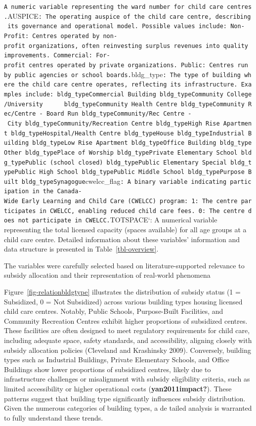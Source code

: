 \documentclass[
  letterpaper,
  DIV=11,
  numbers=noendperiod]{scrartcl}
\begin{document}
\texttt{A\ numeric\ variable\ representing\ the\ ward\ number\ for\ child\ care\ centres.}AUSPICE\texttt{:\ The\ operating\ auspice\ of\ the\ child\ care\ centre,\ describing\ its\ governance\ and\ operational\ model.\ Possible\ values\ include:\ Non-Profit:\ Centres\ operated\ by\ non-profit\ organizations,\ often\ reinvesting\ surplus\ revenues\ into\ quality\ improvements.\ Commercial:\ For-profit\ centres\ operated\ by\ private\ organizations.\ Public:\ Centres\ run\ by\ public\ agencies\ or\ school\ boards.}bldg\_type\texttt{:\ The\ type\ of\ building\ where\ the\ child\ care\ centre\ operates,\ reflecting\ its\ infrastructure.\ Examples\ include:\ bldg\_typeCommercial\ Building\ bldg\_typeCommunity\ College/University\ \ \ \ \ \ bldg\_typeCommunity\ Health\ Centre\ bldg\_typeCommunity\ Rec/Centre\ -\ Board\ Run\ bldg\_typeCommunity/Rec\ Centre\ -\ City\ bldg\_typeCommunity/Recreation\ Centre\ bldg\_typeHigh\ Rise\ Apartment\ bldg\_typeHospital/Health\ Centre\ bldg\_typeHouse\ bldg\_typeIndustrial\ Building\ bldg\_typeLow\ Rise\ Apartment\ bldg\_typeOffice\ Building\ bldg\_typeOther\ bldg\_typePlace\ of\ Worship\ bldg\_typePrivate\ Elementary\ School\ bldg\_typePublic\ (school\ closed)\ bldg\_typePublic\ Elementary\ Special\ bldg\_typePublic\ High\ School\ bldg\_typePublic\ Middle\ School\ bldg\_typePurpose\ Built\ bldg\_typeSynagogue}cwelcc\_flag\texttt{:\ A\ binary\ variable\ indicating\ participation\ in\ the\ Canada-Wide\ Early\ Learning\ and\ Child\ Care\ (CWELCC)\ program:\ 1:\ The\ centre\ participates\ in\ CWELCC,\ enabling\ reduced\ child\ care\ fees.\ 0:\ The\ centre\ does\ not\ participate\ in\ CWELCC.}TOTSPACE`:
A numerical variable representing the total licensed capacity (spaces
available) for all age groups at a child care centre. Detailed
information about these variables' information and data structure is
presented in Table~\ref{tbl-overview}.

The variables were carefully selected based on literature-supported
relevance to subsidy allocation and their representation of real-world
phenomena

Figure~\ref{fig-relationbldgtype} illustrates the distribution of
subsidy status (1 = Subsidized, 0 = Not Subsidized) across various
building types housing licensed child care centres. Notably, Public
Schools, Purpose-Built Facilities, and Community Recreation Centres
exhibit higher proportions of subsidized centres. These facilities are
often designed to meet regulatory requirements for child care, including
adequate space, safety standards, and accessibility, aligning closely
with subsidy allocation policies (Cleveland and Krashinsky 2009).
Conversely, building types such as Industrial Buildings, Private
Elementary Schools, and Office Buildings show lower proportions of
subsidized centres, likely due to infrastructure challenges or
misalignment with subsidy eligibility criteria, such as limited
accessibility or higher operational costs (\textbf{yan2011impact?}).
These patterns suggest that building type significantly influences
subsidy distribution. Given the numerous categories of building types, a
de tailed analysis is warranted to fully understand these trends.
\end{document}
